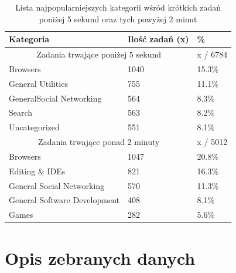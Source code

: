 \documentclass[brudnopis]{xmgr}
\begin{document}
	    \begin{table}[]
        \centering
        \begin{tabular}{|l|l|l|}
            \hline
            Kategoria                           & Ilość zadań (x)   & \%      \\ \hline
            \multicolumn{2}{|c|}{Zadania trwające poniżej 5 sekund} & x / 6784\\ \hline
            Browsers                            & 1040              & 15.3\%  \\ \hline
            General Utilities                   & 755               & 11.1\%  \\ \hline
            GeneralSocial Networking            & 564               & 8.3\%   \\ \hline
            Search                              & 563               & 8.2\%   \\ \hline
            Uncategorized                       & 551               & 8.1\%   \\ \hline
            \multicolumn{2}{|c|}{Zadania trwające ponad 2 minuty}   & x / 5012\\ \hline
            Browsers                            & 1047              & 20.8\%  \\ \hline
            Editing \& IDEs                     & 821               & 16.3\%  \\ \hline
            General Social Networking           & 570               & 11.3\%  \\ \hline
            General Software Development        & 408               & 8.1\%   \\ \hline
            Games                               & 282               & 5.6\%   \\ \hline
        \end{tabular}
        \caption{Lista najpopularniejszych kategorii wśród krótkich zadań poniżej 5 sekund oraz tych powyżej 2 minut}
        \label{Zadania krótkie i długie, które są najpopularniejsze?}
        \end{table}

\section{Opis zebranych danych}
\end{document}
